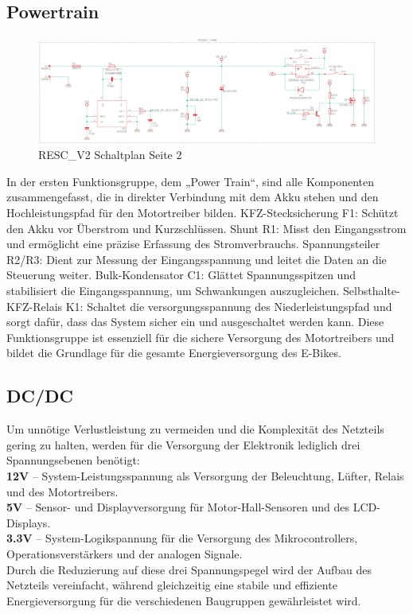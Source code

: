 \documentclass[paper=a4,11pt]{scrreprt}
\begin{document}
\subsection{Powertrain}

\begin{figure}[ht]
\begin{center}
\includegraphics[width=14cm]{Bilder/Powertrain.PNG}
\caption{RESC\_V2 Schaltplan Seite 2}
\label{Powertrain}
\end{center}
\end{figure}

In der ersten Funktionsgruppe, dem „Power Train“, sind alle Komponenten zusammengefasst, die in direkter Verbindung mit dem Akku stehen und den Hochleistungspfad für den Motortreiber bilden.
KFZ-Stecksicherung F1: Schützt den Akku vor Überstrom und Kurzschlüssen.
Shunt R1: Misst den Eingangsstrom und ermöglicht eine präzise Erfassung des Stromverbrauchs.
Spannungsteiler R2/R3: Dient zur Messung der Eingangsspannung und leitet die Daten an die Steuerung weiter.
Bulk-Kondensator C1: Glättet Spannungsspitzen und stabilisiert die Eingangsspannung, um Schwankungen auszugleichen.
Selbsthalte-KFZ-Relais K1: Schaltet die versorgungsspannung des Niederleistungspfad und sorgt dafür, dass das System sicher ein und ausgeschaltet werden kann.
Diese Funktionsgruppe ist essenziell für die sichere Versorgung des Motortreibers und bildet die Grundlage für die gesamte Energieversorgung des E-Bikes.

\subsection{DC/DC}

Um unnötige Verlustleistung zu vermeiden und die Komplexität des Netzteils gering zu halten, werden für die Versorgung der Elektronik lediglich drei Spannungsebenen benötigt:\\
\textbf{12V} – System-Leistungsspannung als Versorgung der Beleuchtung, Lüfter, Relais und des Motortreibers.\\
\textbf{5V} – Sensor- und Displayversorgung für Motor-Hall-Sensoren und des LCD-Displays.\\
\textbf{3.3V} – System-Logikspannung für die Versorgung des Mikrocontrollers, Operationsverstärkers und der analogen Signale.\\
Durch die Reduzierung auf diese drei Spannungspegel wird der Aufbau des Netzteils vereinfacht, während gleichzeitig eine stabile und effiziente Energieversorgung für die verschiedenen Baugruppen gewährleistet wird.\\
\newpage
\end{document}
